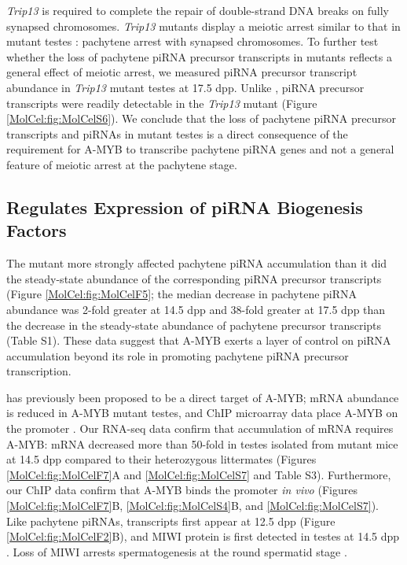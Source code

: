     \textit{Trip13} is required to complete the repair of double-strand DNA breaks on fully synapsed chromosomes. \textit{Trip13} mutants display a meiotic arrest similar to that in \amyb{} mutant testes \citep{Li2007}: pachytene arrest with synapsed chromosomes. To further test whether the loss of pachytene piRNA precursor transcripts in \amyb{} mutants reflects a general effect of meiotic arrest, we measured piRNA precursor transcript abundance in \textit{Trip13} mutant testes at 17.5 dpp. Unlike \amyb{}, piRNA precursor transcripts were readily detectable in the \textit{Trip13} mutant (Figure \ref{MolCel:fig:MolCelS6}). We conclude that the loss of pachytene piRNA precursor transcripts and piRNAs in \amyb{} mutant testes is a direct consequence of the requirement for A-MYB to transcribe pachytene piRNA genes and not a general feature of meiotic arrest at the pachytene stage.

  \subsection{\amyb{} Regulates Expression of piRNA Biogenesis Factors}
    \label{MolCel:subsec:A-Myb regulations piRNA machinery}

    The \amyb{} mutant more strongly affected pachytene piRNA accumulation than it did the steady-state abundance of the corresponding piRNA precursor transcripts (Figure \ref{MolCel:fig:MolCelF5}; the median decrease in pachytene piRNA abundance was 2-fold greater at 14.5 dpp and 38-fold greater at 17.5 dpp than the decrease in the steady-state abundance of pachytene precursor transcripts (Table S1). These data suggest that A-MYB exerts a layer of control on piRNA accumulation beyond its role in promoting pachytene piRNA precursor transcription.

    \miwi{} has previously been proposed to be a direct target of A-MYB; \miwi{} mRNA abundance is reduced in A-MYB mutant testes, and ChIP microarray data place A-MYB on the \miwi{} promoter \citep{Bolcun-Filas2011}. Our RNA-seq data confirm that accumulation of \miwi{} mRNA requires A-MYB: \miwi{} mRNA decreased more than 50-fold in testes isolated from \amyb{} mutant mice at 14.5 dpp compared to their heterozygous littermates (Figures \ref{MolCel:fig:MolCelF7}A and \ref{MolCel:fig:MolCelS7} and Table S3). Furthermore, our ChIP data confirm that A-MYB binds the \miwi{} promoter \textit{in vivo} (Figures \ref{MolCel:fig:MolCelF7}B, \ref{MolCel:fig:MolCelS4}B, and \ref{MolCel:fig:MolCelS7}). Like pachytene piRNAs, \miwi{} transcripts first appear at 12.5 dpp (Figure \ref{MolCel:fig:MolCelF2}B), and MIWI protein is first detected in testes at 14.5 dpp \citep{Deng2002c}. Loss of MIWI arrests spermatogenesis at the round spermatid stage \citep{Deng2002c}.

